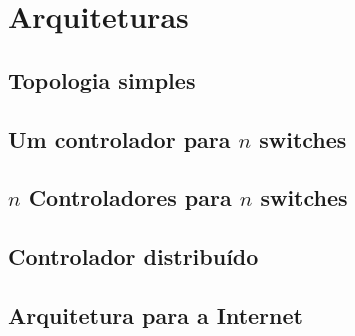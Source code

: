 \section{Arquiteturas}


\subsection{Topologia simples}

\subsection{Um controlador para $n$ switches}

\subsection{$n$ Controladores para $n$ switches}

\subsection{Controlador distribuído}

\subsection{Arquitetura para a Internet}
